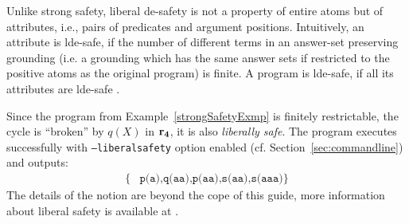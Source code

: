 \documentclass[a4paper, titlepage]{article}
\newcommand{\row}[1]{%
  \ensuremath{\color{black}\ensuremath{\mathbf{#1}} \color{black}}%
}
\begin{document}
Unlike strong safety, liberal de-safety is not a property of entire atoms but of attributes, i.e., pairs of
predicates and argument positions. Intuitively, an attribute is lde-safe, if the number of different terms in
an answer-set preserving grounding (i.e. a grounding which has the same answer sets if restricted to the
positive atoms as the original program) is finite. A program is lde-safe, if all its attributes are lde-safe \cite{efikrs2015}.

Since the program from Example~\ref{strongSafetyExmp} is finitely restrictable, the cycle is “broken” by $\mathit{q(X)}$ in $\row{r_4}$, it is also \emph{liberally safe}. The program executes successfully with \texttt{--liberalsafety} option enabled (cf. Section~\ref{sec:commandline}) and outputs:
\begin{align*}
\{ & 
\texttt{p(a),q(aa),p(aa),s(aa),s(aaa)}
\}
\end{align*}
The details of the notion are beyond the cope of this guide, more information about liberal safety is available at \cite{eite-etal-14a}.

\newpage


\end{document}
